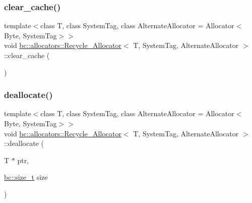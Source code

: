 \mbox{\label{structbc_1_1allocators_1_1Recycle__Allocator_a1e590ab61de9111227b368d20c15112d}} 
\subsubsection{\texorpdfstring{clear\+\_\+cache()}{clear\_cache()}}
{\footnotesize\ttfamily template$<$class T, class System\+Tag, class Alternate\+Allocator = Allocator$<$\+Byte, System\+Tag$>$$>$ \\
void \hyperlink{structbc_1_1allocators_1_1Recycle__Allocator}{bc\+::allocators\+::\+Recycle\+\_\+\+Allocator}$<$ T, System\+Tag, Alternate\+Allocator $>$\+::clear\+\_\+cache (\begin{DoxyParamCaption}{ }\end{DoxyParamCaption})\hspace{0.3cm}{\ttfamily [inline]}}

\mbox{\label{structbc_1_1allocators_1_1Recycle__Allocator_a88a5438416502d49e3c9308c9053b44f}} 
\subsubsection{\texorpdfstring{deallocate()}{deallocate()}}
{\footnotesize\ttfamily template$<$class T, class System\+Tag, class Alternate\+Allocator = Allocator$<$\+Byte, System\+Tag$>$$>$ \\
void \hyperlink{structbc_1_1allocators_1_1Recycle__Allocator}{bc\+::allocators\+::\+Recycle\+\_\+\+Allocator}$<$ T, System\+Tag, Alternate\+Allocator $>$\+::deallocate (\begin{DoxyParamCaption}\item[{T $\ast$}]{ptr,  }\item[{\hyperlink{namespacebc_aaf8e3fbf99b04b1b57c4f80c6f55d3c5}{bc\+::size\+\_\+t}}]{size }\end{DoxyParamCaption})\hspace{0.3cm}{\ttfamily [inline]}}

